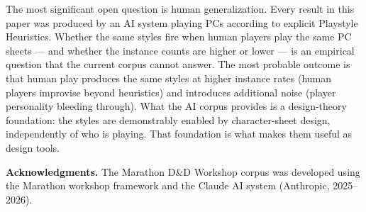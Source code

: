 The most significant open question is human generalization. Every result in this
paper was produced by an AI system playing PCs according to explicit Playstyle
Heuristics. Whether the same styles fire when human players play the same PC sheets
--- and whether the instance counts are higher or lower --- is an empirical question
that the current corpus cannot answer. The most probable outcome is that human play
produces the same styles at higher instance rates (human players improvise beyond
heuristics) and introduces additional noise (player personality bleeding through).
What the AI corpus provides is a design-theory foundation: the styles are demonstrably
enabled by character-sheet design, independently of who is playing. That foundation
is what makes them useful as design tools.

\bigskip
\noindent\textbf{Acknowledgments.} The Marathon D\&D Workshop corpus was developed using
the Marathon workshop framework and the Claude AI system (Anthropic, 2025--2026).
